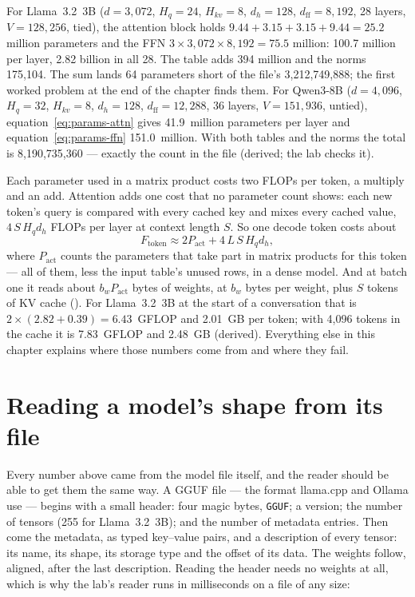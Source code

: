 For Llama~3.2~3B ($d=3{,}072$, $H_q=24$, $H_{kv}=8$, $d_h=128$,
$d_{\mathrm{ff}}=8{,}192$, 28 layers, $V=128{,}256$, tied), the attention block
holds $9.44 + 3.15 + 3.15 + 9.44 = 25.2$ million parameters and the FFN
$3 \times 3{,}072 \times 8{,}192 = 75.5$ million: 100.7 million per layer,
2.82 billion in all 28. The table adds 394 million and the norms 175,104. The
sum lands 64 parameters short of the file's 3,212,749,888; the first worked
problem at the end of the chapter finds them. For Qwen3-8B
($d=4{,}096$, $H_q=32$, $H_{kv}=8$, $d_h=128$, $d_{\mathrm{ff}}=12{,}288$,
36 layers, $V=151{,}936$, untied), equation~\eqref{eq:params-attn} gives
41.9~million parameters per layer and equation~\eqref{eq:params-ffn} 151.0~million.
With both tables and the norms the total is 8,190,735,360 --- exactly the count
in the file (derived; the lab checks it).

Each parameter used in a matrix product costs two FLOPs per token, a multiply
and an add. Attention adds one cost that no parameter count shows: each new
token's query is compared with every cached key and mixes every cached value,
$4\,S\,H_qd_h$ FLOPs per layer at context length $S$. So one decode token
costs about
\begin{equation}
F_{\text{token}} \approx 2P_{\text{act}} + 4\,L\,S\,H_qd_h,
\label{eq:flops-token}
\end{equation}
where $P_{\text{act}}$ counts the parameters that take part in matrix
products for this token --- all of them, less the input table's unused rows,
in a dense model. And at batch one it reads about $b_w P_{\text{act}}$ bytes
of weights, at $b_w$ bytes per weight, plus $S$ tokens of KV cache
(). For Llama~3.2~3B at the start of a conversation that is
$2 \times (2.82 + 0.39) = 6.43$~GFLOP and 2.01~GB per token; with 4,096 tokens
in the cache it is 7.83~GFLOP and 2.48~GB (derived). Everything else in this
chapter explains where those numbers come from and where they fail.

\section{Reading a model's shape from its file}

Every number above came from the model file itself, and the reader should be
able to get them the same way. A GGUF file --- the format llama.cpp and Ollama
use --- begins with a small header: four magic bytes, \texttt{GGUF}; a
version; the number of tensors (255 for Llama~3.2~3B); and the number of
metadata entries. Then come the metadata, as typed key--value pairs, and a
description of every tensor: its name, its shape, its storage type and the
offset of its data. The weights follow, aligned, after the last description.
Reading the header needs no weights at all, which is why the lab's reader runs
in milliseconds on a file of any size:

